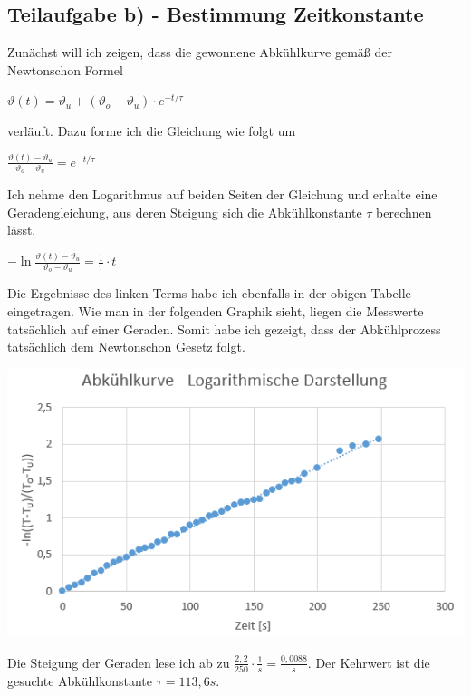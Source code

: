 \documentclass{article}
\begin{document}
\subsection*{Teilaufgabe b) - Bestimmung Zeitkonstante}
Zunächst will ich zeigen, dass die gewonnene Abkühlkurve gemäß der Newtonschon Formel 
\begin{center}
	$\vartheta (t) = \vartheta_u + (\vartheta_o - \vartheta_u) \cdot e^{-t/\tau}$ 
\end{center}
verläuft. Dazu forme ich die Gleichung wie folgt um
\begin{center}
	$\frac{\vartheta (t) - \vartheta_u}{\vartheta_o - \vartheta_u} = e^{-t/\tau}$ 
\end{center}
Ich nehme den Logarithmus auf beiden Seiten der Gleichung und erhalte eine Geradengleichung, 
aus deren Steigung sich die Abkühlkonstante $\tau$ berechnen lässt.
\begin{center}
	$-\ln{\frac{\vartheta (t) - \vartheta_u}{\vartheta_o - \vartheta_u}} = \frac{1}{\tau}\cdot t$ 
\end{center}
Die Ergebnisse des linken Terms habe ich ebenfalls in der obigen Tabelle eingetragen. 
Wie man in der folgenden Graphik sieht, liegen die Messwerte tatsächlich auf einer Geraden. Somit habe ich gezeigt, dass der Abkühlprozess tatsächlich dem Newtonschon Gesetz folgt.  
\begin{center}
	\includegraphics[scale=0.6]{Graph2.png}
\end{center}
Die Steigung der Geraden lese ich ab zu $\frac{2,2}{250}\cdot\frac{1}{s}=\frac{0,0088}{s}$.
Der Kehrwert ist die gesuchte Abkühlkonstante $\tau = 113,6 s$.
\end{document}
